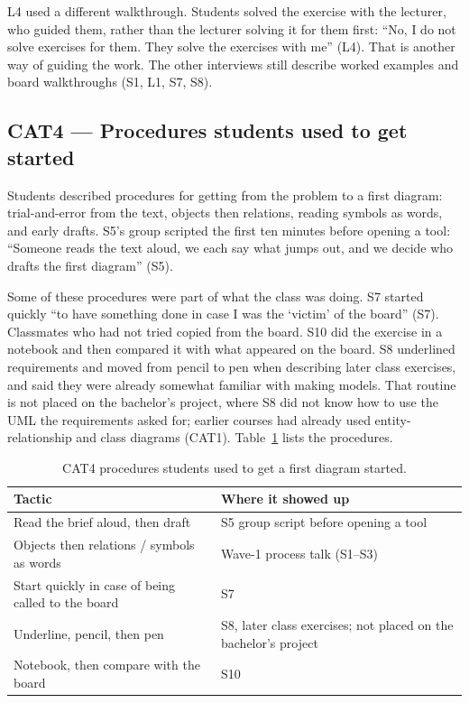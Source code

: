 L4 used a different walkthrough. Students solved the exercise with the lecturer, who guided them, rather than the lecturer solving it for them first: ``No, I do not solve exercises for them. They solve the exercises with me'' (L4). That is another way of guiding the work. The other interviews still describe worked examples and board walkthroughs (S1, L1, S7, S8).

\subsection{CAT4 --- Procedures students used to get started}
\label{sec:cat4}

Students described procedures for getting from the problem to a first diagram: trial-and-error from the text, objects then relations, reading symbols as words, and early drafts. S5's group scripted the first ten minutes before opening a tool: ``Someone reads the text aloud, we each say what jumps out, and we decide who drafts the first diagram'' (S5).

Some of these procedures were part of what the class was doing. S7 started quickly ``to have something done in case I was the `victim' of the board'' (S7). Classmates who had not tried copied from the board. S10 did the exercise in a notebook and then compared it with what appeared on the board. S8 underlined requirements and moved from pencil to pen when describing later class exercises, and said they were already somewhat familiar with making models. That routine is not placed on the bachelor's project, where S8 did not know how to use the UML the requirements asked for; earlier courses had already used entity-relationship and class diagrams (CAT1). Table~\ref{tab:cat4_tactics} lists the procedures.

\begin{table}[htbp]
\centering
\small
\caption{CAT4 procedures students used to get a first diagram started.}
\label{tab:cat4_tactics}
\begin{tabularx}{\textwidth}{l >{\raggedright\arraybackslash}X}
\toprule
\textbf{Tactic} & \textbf{Where it showed up} \\
\midrule
Read the brief aloud, then draft & S5 group script before opening a tool \\
Objects then relations / symbols as words & Wave-1 process talk (S1--S3) \\
Start quickly in case of being called to the board & S7 \\
Underline, pencil, then pen & S8, later class exercises; not placed on the bachelor's project \\
Notebook, then compare with the board & S10 \\
\bottomrule
\end{tabularx}
\end{table}

